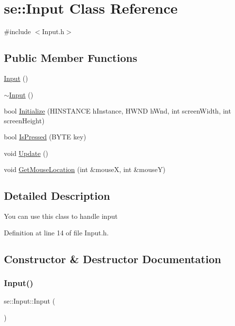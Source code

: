 \hypertarget{classse_1_1_input}{}\section{se\+:\+:Input Class Reference}
\label{classse_1_1_input}


{\ttfamily \#include $<$Input.\+h$>$}

\subsection*{Public Member Functions}
\begin{DoxyCompactItemize}
\item 
\mbox{\hyperlink{classse_1_1_input_a9302103358f3dc3e059df897b0174fc5}{Input}} ()
\item 
\mbox{\hyperlink{classse_1_1_input_ad856d30ccdab1d654eb59b0895ade26c}{$\sim$\+Input}} ()
\item 
bool \mbox{\hyperlink{classse_1_1_input_a3f76e2bdfbd322766cc08a9ddda9727a}{Initialize}} (H\+I\+N\+S\+T\+A\+N\+CE h\+Instance, H\+W\+ND h\+Wnd, int screen\+Width, int screen\+Height)
\item 
bool \mbox{\hyperlink{classse_1_1_input_a7f63b679d5f26fd7022be7028218a3da}{Is\+Pressed}} (B\+Y\+TE key)
\item 
void \mbox{\hyperlink{classse_1_1_input_a823406d60664b299791026e869abe121}{Update}} ()
\item 
void \mbox{\hyperlink{classse_1_1_input_a6088639b8f77563aad712a7c9708edf1}{Get\+Mouse\+Location}} (int \&mouseX, int \&mouseY)
\end{DoxyCompactItemize}


\subsection{Detailed Description}
You can use this class to handle input 

Definition at line 14 of file Input.\+h.



\subsection{Constructor \& Destructor Documentation}
\mbox{\label{classse_1_1_input_a9302103358f3dc3e059df897b0174fc5}} 
\subsubsection{\texorpdfstring{Input()}{Input()}}
{\footnotesize\ttfamily se\+::\+Input\+::\+Input (\begin{DoxyParamCaption}{ }\end{DoxyParamCaption})}

